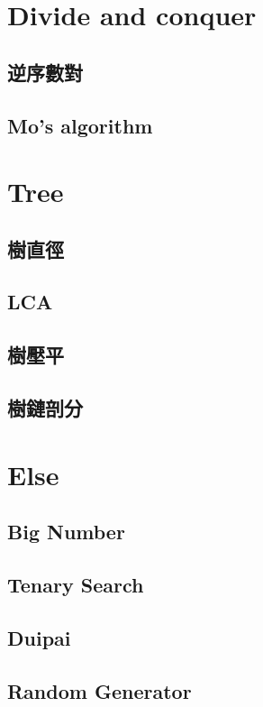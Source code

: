 \section{Divide and conquer}
\subsection{逆序數對}

\subsection{Mo's algorithm}


\section{Tree}
\subsection{樹直徑}

\subsection{LCA}

\subsection{樹壓平}

\subsection{樹鏈剖分}


\section{Else}
\subsection{Big Number}

\subsection{Tenary Search}

\subsection{Duipai}

\subsection{Random Generator}
